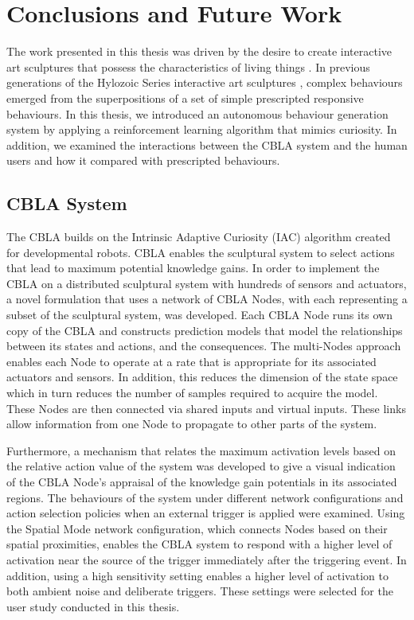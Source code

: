 \chapter{Conclusions and Future Work} \label{chap:conclusions}
 
The work presented in this thesis was driven by the desire to create interactive art sculptures that possess the characteristics of living things \cite{Gorbet2015}. In previous generations of the Hylozoic Series interactive art sculptures \cite{Beesley2012}, complex behaviours emerged from the superpositions of a set of simple prescripted responsive behaviours. In this thesis, we introduced an autonomous behaviour generation system by applying a reinforcement learning algorithm that mimics curiosity. In addition, we examined the interactions between the CBLA system and the human users and how it compared with prescripted behaviours.
 
\section{CBLA System}
The CBLA builds on the Intrinsic Adaptive Curiosity (IAC) algorithm \cite{Oudeyer2007} created for developmental robots. CBLA enables the sculptural system to select actions that lead to maximum potential knowledge gains. In order to implement the CBLA on a distributed sculptural system with hundreds of sensors and actuators, a novel formulation that uses a network of CBLA Nodes, with each representing a subset of the sculptural system, was developed. Each CBLA Node runs its own copy of the CBLA and constructs prediction models that model the relationships between its states and actions, and the consequences. The multi-Nodes approach enables each Node to operate at a rate that is appropriate for its associated actuators and sensors. In addition, this reduces the dimension of the state space which in turn reduces the number of samples required to acquire the model. These Nodes are then connected via shared inputs and virtual inputs. These links allow information from one Node to propagate to other parts of the system. 

Furthermore, a mechanism that relates the maximum activation levels based on the relative action value of the system was developed to give a visual indication of the CBLA Node's appraisal of the knowledge gain potentials in its associated regions. 
The behaviours of the system under different network configurations and action selection policies when an external trigger is applied were examined. Using the Spatial Mode network configuration, which connects Nodes based on their spatial proximities, enables the CBLA system to respond with a higher level of activation near the source of the trigger immediately after the triggering event. In addition, using a high sensitivity setting enables a higher level of activation to both ambient noise and deliberate triggers. These settings were selected for the user study conducted in this thesis.


